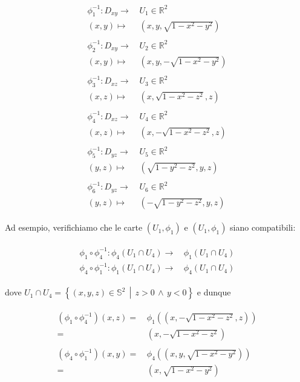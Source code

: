 \begin{align}
	\begin{split}
		\phi_{1}^{-1} : D_{xy} \to& \, U_{1} \in \mathbb{R}^{2}\\
		(x,y) \mapsto& \, (x,y,\sqrt{1-x^{2}-y^{2}})\\\\
		\phi_{2}^{-1} : D_{xy} \to& \, U_{2} \in \mathbb{R}^{2}\\
		(x,y) \mapsto& \, (x,y,-\sqrt{1-x^{2}-y^{2}})\\\\
		\phi_{3}^{-1} : D_{xz} \to& \, U_{3} \in \mathbb{R}^{2}\\
		(x,z) \mapsto& \, (x,\sqrt{1-x^{2}-z^{2}},z)\\\\
		\phi_{4}^{-1} : D_{xz} \to& \, U_{4} \in \mathbb{R}^{2}\\
		(x,z) \mapsto& \, (x,-\sqrt{1-x^{2}-z^{2}},z)\\\\
		\phi_{5}^{-1} : D_{yz} \to& \, U_{5} \in \mathbb{R}^{2}\\
		(y,z) \mapsto& \, (\sqrt{1-y^{2}-z^{2}},y,z)\\\\
		\phi_{6}^{-1} : D_{yz} \to& \, U_{6} \in \mathbb{R}^{2}\\
		(y,z) \mapsto& \, (-\sqrt{1-y^{2}-z^{2}},y,z)
	\end{split}
\end{align}

Ad esempio, verifichiamo che le carte $ (U_{1},\phi_{1}) $ e $ (U_{1},\phi_{1}) $ siano compatibili:

\begin{align}
	\begin{split}
		\phi_{1} \circ \phi_{4}^{-1} : \phi_{4}(U_{1} \cap U_{4}) \to& \, \phi_{1}(U_{1} \cap U_{4})\\
		\phi_{4} \circ \phi_{1}^{-1} : \phi_{1}(U_{1} \cap U_{4}) \to& \, \phi_{4}(U_{1} \cap U_{4})
	\end{split}
\end{align}

dove $ U_{1} \cap U_{4} = \left\{ (x,y,z) \in \mathbb{S}^{2} \, \middle| \, z>0 \, \wedge \, y<0 \right\} $ e dunque 

\begin{align}
	\begin{split}
		(\phi_{1} \circ \phi_{4}^{-1})(x,z) =& \, \phi_{1}((x,-\sqrt{1-x^{2}-z^{2}},z))\\
		=& \, (x,-\sqrt{1-x^{2}-z^{2}})\\\\
		(\phi_{4} \circ \phi_{1}^{-1})(x,y) =& \, \phi_{4}((x,y,\sqrt{1-x^{2}-y^{2}}))\\
		=& \, (x,\sqrt{1-x^{2}-y^{2}})
	\end{split}
\end{align}

